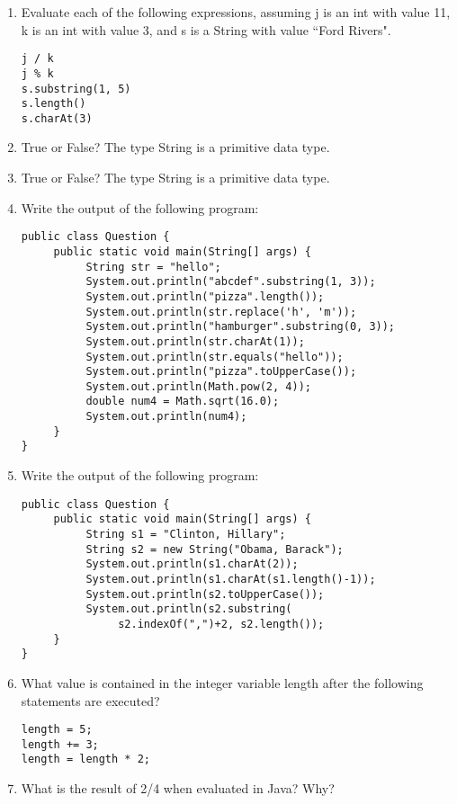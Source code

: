 \begin{enumerate}[label={\arabic{counter}\addtocounter{counter}{1}}.]
\item Evaluate each of the following expressions, assuming j is an int with value 11, k is an int with value 3, and s is a String with value ``Ford Rivers".
\begin{lstlisting}
j / k
j % k
s.substring(1, 5)
s.length()
s.charAt(3)
\end{lstlisting}

\item True or False? The type String is a primitive data type.

\item True or False? The type String is a primitive data type.

\item Write the output of the following program:
\begin{lstlisting}
public class Question {
     public static void main(String[] args) {
          String str = "hello";
          System.out.println("abcdef".substring(1, 3));
          System.out.println("pizza".length());
          System.out.println(str.replace('h', 'm'));
          System.out.println("hamburger".substring(0, 3));
          System.out.println(str.charAt(1));
          System.out.println(str.equals("hello"));
          System.out.println("pizza".toUpperCase());
          System.out.println(Math.pow(2, 4));
          double num4 = Math.sqrt(16.0);
          System.out.println(num4);
     }
}
\end{lstlisting}

\item Write the output of the following program:
\begin{lstlisting}
public class Question {
     public static void main(String[] args) {
          String s1 = "Clinton, Hillary";
          String s2 = new String("Obama, Barack");
          System.out.println(s1.charAt(2));
          System.out.println(s1.charAt(s1.length()-1));
          System.out.println(s2.toUpperCase());
          System.out.println(s2.substring(
               s2.indexOf(",")+2, s2.length());
     }
}
\end{lstlisting}

\item What value is contained in the integer variable length after the following statements are executed?
\begin{lstlisting}
length = 5;
length += 3;
length = length * 2;
\end{lstlisting}

\item What is the result of 2/4 when evaluated in Java? Why?

\end{enumerate}


